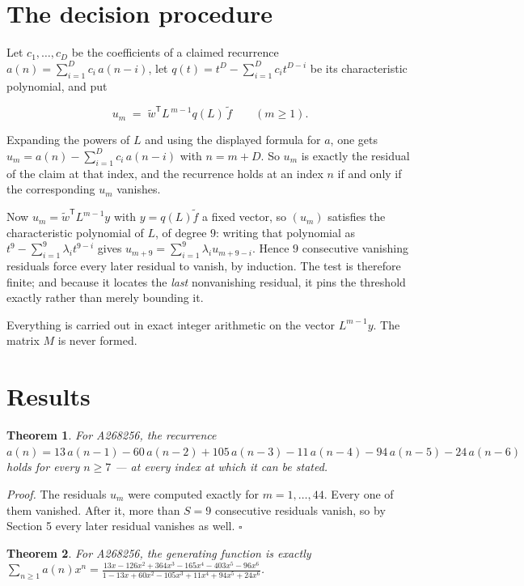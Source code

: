 \documentclass[11pt]{article}
\newtheorem{theorem}{Theorem}
\theoremstyle{definition}
\begin{document}
\section{The decision procedure}

Let $c_1,\dots,c_D$ be the coefficients of a claimed recurrence $a(n) = \sum_{i=1}^{D} c_i\,a(n-i)$, let $q(t) = t^{D} - \sum_{i=1}^{D} c_i t^{D-i}$ be its characteristic polynomial, and put

\[u_m \;=\; \tilde w^{\mathsf T} L^{\,m-1} q(L)\,\tilde f \qquad (m \ge 1).\]

Expanding the powers of $L$ and using the displayed formula for $a$, one gets $u_m = a(n) - \sum_{i=1}^{D} c_i\,a(n-i)$ with $n = m + D$. So $u_m$ is exactly the residual of the claim at that index, and the recurrence holds at an index $n$ if and only if the corresponding $u_m$ vanishes.

Now $u_m = \tilde w^{\mathsf T} L^{m-1} y$ with $y = q(L)\tilde f$ a fixed vector, so $(u_m)$ satisfies the characteristic polynomial of $L$, of degree $9$: writing that polynomial as $t^{9} - \sum_{i=1}^{9} \lambda_i t^{9-i}$ gives $u_{m+9} = \sum_{i=1}^{9} \lambda_i u_{m+9-i}$. Hence $9$ consecutive vanishing residuals force every later residual to vanish, by induction. The test is therefore finite; and because it locates the {\itshape last} nonvanishing residual, it pins the threshold exactly rather than merely bounding it.

Everything is carried out in exact integer arithmetic on the vector $L^{m-1}y$. The matrix $M$ is never formed.

\section{Results}

\begin{theorem} For A268256, the recurrence $a(n) = 13\,a(n-1) - 60\,a(n-2) + 105\,a(n-3) - 11\,a(n-4) - 94\,a(n-5) - 24\,a(n-6)$ holds for every $n \ge 7$ --- at every index at which it can be stated.\end{theorem}

{\itshape Proof.} The residuals $u_m$ were computed exactly for $m = 1,\dots,44$. Every one of them vanished. After it, more than $S = 9$ consecutive residuals vanish, so by Section 5 every later residual vanishes as well. $\square$

\begin{theorem} For A268256, the generating function is exactly $\sum_{n\ge 1} a(n)x^n = \frac{13x - 126x^{2} + 364x^{3} - 165x^{4} - 403x^{5} - 96x^{6}}{1 - 13x + 60x^{2} - 105x^{3} + 11x^{4} + 94x^{5} + 24x^{6}}$.\end{theorem}
\end{document}

